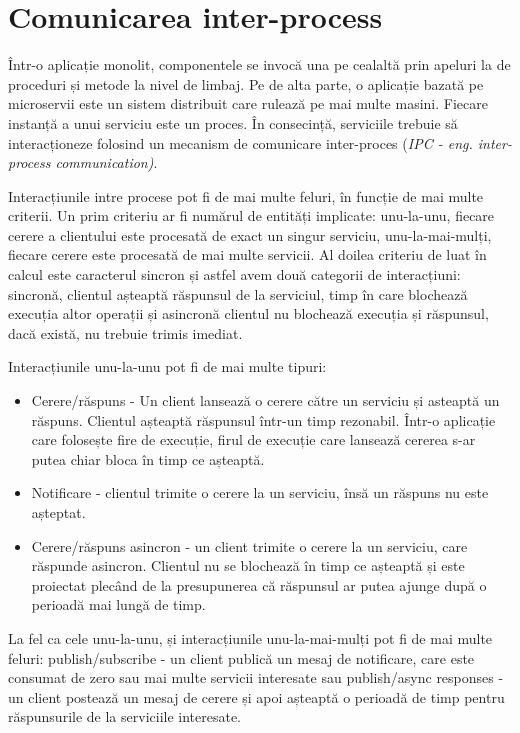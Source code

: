 \documentclass[12pt, a4paper, oneside, romanian]{teza-upb}
\begin{document}
\section{Comunicarea inter-process}

Într-o aplicație monolit, componentele se invocă una pe cealaltă prin apeluri la de proceduri și metode la nivel de limbaj. Pe de alta parte, o aplicație bazată pe microservii este un sistem distribuit care rulează pe mai multe masini. Fiecare instanță a unui serviciu este un proces. În consecință, serviciile trebuie să interacționeze folosind un mecanism de comunicare inter-proces (\textit{IPC - eng. inter-process communication)}.

Interacțiunile intre procese pot fi de mai multe feluri, în funcție de mai multe criterii.  Un prim criteriu ar fi numărul de entități implicate: unu-la-unu, fiecare cerere a clientului este procesată de exact un singur serviciu, unu-la-mai-mulți, fiecare cerere este procesată de mai multe servicii. Al doilea criteriu de luat în calcul este caracterul sincron și astfel avem două categorii de interacțiuni: sincronă, clientul așteaptă răspunsul de la serviciul, timp în care blochează execuția altor operații și asincronă clientul nu blochează execuția și răspunsul, dacă există, nu trebuie trimis imediat.

Interacțiunile unu-la-unu pot fi de mai multe tipuri:

\begin{itemize}
 \item Cerere/răspuns - Un client lansează o cerere către un serviciu și asteaptă un răspuns. Clientul așteaptă răspunsul într-un timp rezonabil. Într-o aplicație care folosește fire de execuție, firul de execuție care lansează cererea s-ar putea chiar bloca în timp ce așteaptă. 
 \item Notificare - clientul trimite o cerere la un serviciu, însă un răspuns nu este așteptat.
 \item Cerere/răspuns asincron - un client trimite o cerere la un serviciu, care răspunde asincron. Clientul nu se blochează în timp ce așteaptă și este proiectat plecând de la presupunerea că răspunsul ar putea ajunge după o perioadă mai lungă de timp.
\end{itemize}
 
La fel ca cele unu-la-unu, și interacțiunile unu-la-mai-mulți pot fi de mai multe feluri:
publish/subscribe - un client publică un mesaj de notificare, care este consumat de zero sau mai multe servicii interesate sau publish/async responses - un client postează un mesaj de cerere și apoi așteaptă o perioadă de timp pentru răspunsurile de la serviciile interesate. 
\end{document}
